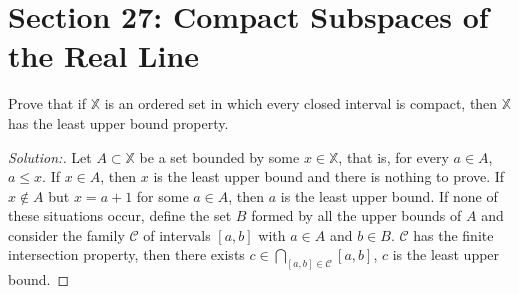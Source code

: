 \documentclass[a4paper,12pt, reqno]{article}
\theoremstyle{definition}
\newenvironment{exerr}[1]{
  \renewcommand\theexeralt{#1}
  \exeralt
}{\endexeralt}
\newenvironment{solution}{\begin{proof}[Solution:]}{\end{proof}}
\newcommand{\C}{\mathscr{C}}
\newcommand{\X}{\mathbb{X}}
\begin{document}
\section*{Section 27: Compact Subspaces of the Real Line}

\begin{exerr}{1}
  Prove that if $\X$ is an ordered set in which every closed interval is compact, then $\X$ has the least upper bound property.
\end{exerr}
\begin{solution}
  Let $A\subset\X$ be a set bounded by some $x\in\X$, that is, for every $a\in A$, $a\leq x$. If $x\in A$, then $x$ is the least upper bound and there is nothing to prove. If $x\notin A$ but $x = a+1$ for some $a\in A$, then $a$ is the least upper bound. If none of these situations occur, define the set $B$ formed by all the upper bounds of $A$ and consider the family $\C$ of intervals $[a,b]$ with $a\in A$ and $b\in B$. $\C$ has the finite intersection property, then there exists $c\in\bigcap_{[a,b]\in\C}[a,b]$, $c$ is the least upper bound.
\end{solution}
\end{document}
